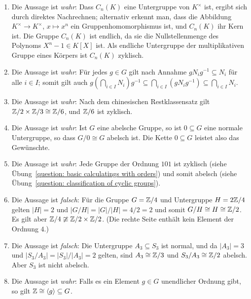 \begin{solution}
  \begin{enumerate}
    \item
      Die Aussage ist \emph{wahr}:
      Dass $C_n(K)$ eine Untergruppe von $K^\times$ ist, ergibt sich durch direktes Nachrechnen;
      alternativ erkennt man, dass die Abbildung $K^\times \to K^\times$, $x \mapsto x^n$ ein Gruppenhomomorphismus ist, und $C_n(K)$ ihr Kern ist.
      Die Gruppe $C_n(K)$ ist endlich, da sie die Nullstellenmenge des Polynoms $X^n - 1 \in K[X]$ ist.
      Als endliche Untergruppe der multiplikativen Gruppe eines Körpers ist $C_n(K)$ zyklisch.
    \item
      Die Aussage ist \emph{wahr}:
      Für jedes $g \in G$ gilt nach Annahme $g N_i g^{-1} \subseteq N_i$ für alle $i \in I$;
      somit gilt auch $g \left( \bigcap_{i \in I} N_i \right) g^{-1} \subseteq \bigcap_{i \in I} (g N_i g^{-1}) \subseteq \bigcap_{i \in I} N_i$.
    \item
      Die Aussage ist \emph{wahr}:
      Nach dem chinesischen Restklassensatz gilt $\mathbb{Z}/2 \times \mathbb{Z}/3 \cong \mathbb{Z}/6$, und $\mathbb{Z}/6$ ist zyklisch.
    \item
      Die Aussage ist \emph{wahr}:
      Ist $G$ eine abelsche Gruppe, so ist $0 \subseteq G$ eine normale Untergruppe, so dass $G/0 \cong G$ abelsch ist.
      Die Kette $0 \subseteq G$ leistet also das Gewünschte.
    \item
      Die Aussage ist \emph{wahr}:
      Jede Gruppe der Ordnung $101$ ist zyklisch (siehe Übung~\ref{question: basic calculatings with orders}) und somit abelsch (siehe Übung~\ref{question: classification of cyclic groups}).
    \item
      Die Aussage ist \emph{falsch}:
      Für die Gruppe $G = \mathbb{Z}/4$ und Untergruppe $H = 2\mathbb{Z}/4$ gelten $|H| = 2$ und $|G/H| = |G|/|H| = 4/2 = 2$ und somit $G/H \cong H \cong \mathbb{Z}/2$.
      Es gilt aber $\mathbb{Z}/4 \ncong \mathbb{Z}/2 \times \mathbb{Z}/2$.
      (Die rechte Seite enthält kein Element der Ordnung $4$.)
    \item
      Die Aussage ist \emph{falsch}:
      Die Untergruppe $A_3 \subseteq S_3$ ist normal, und da $|A_3| = 3$ und $|S_3/A_3| = |S_3|/|A_3| = 2$ gelten, sind $A_3 \cong \mathbb{Z}/3$ und $S_3/A_3 \cong \mathbb{Z}/2$ abelsch.
      Aber $S_3$ ist nicht abelsch.
    \item
      Die Aussage ist \emph{wahr}:
      Falls es ein Element $g \in G$ unendlicher Ordnung gibt, so gilt $\mathbb{Z} \cong \langle g\rangle \subseteq G$.

\end{enumerate}
\end{solution}
